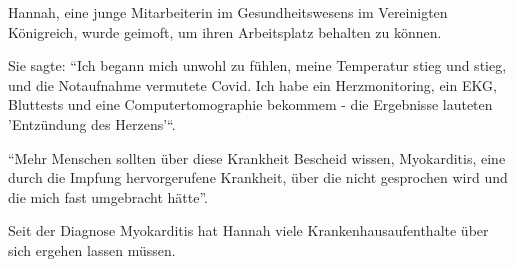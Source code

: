 Hannah, eine junge Mitarbeiterin im Gesundheitswesens im Vereinigten Königreich,
wurde geimoft, um ihren Arbeitsplatz behalten zu können.

Sie sagte: ``Ich begann mich unwohl zu fühlen, meine Temperatur stieg und stieg,
und die Notaufnahme vermutete Covid. Ich habe ein Herzmonitoring, ein EKG,
Bluttests und eine Computertomographie bekommem - die Ergebnisse lauteten
'Entzündung des Herzens'``.

``Mehr Menschen sollten über diese Krankheit Bescheid wissen, Myokarditis, eine
durch die Impfung hervorgerufene Krankheit, über die nicht gesprochen wird und
die mich fast umgebracht hätte''.

Seit der Diagnose Myokarditis hat Hannah viele Krankenhausaufenthalte über sich
ergehen lassen müssen.
